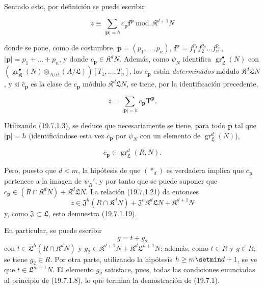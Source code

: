 Sentado esto, por definición se puede escribir
\begin{env}[19.7.1.21]
\label{IV.19.7.1.21}
\[
  z\equiv\sum_{|\mathbf p|=h}c_{\mathbf p}\mathbf f^{\mathbf p}\ \mathrm{mod.}\,\mathfrak K^{d+1}N
\]
\end{env}
donde se pone, como de costumbre, $\mathbf p=(p_1,\ldots,p_n)$, $\mathbf f^{\mathbf p}=f_1^{p_1}f_2^{p_2}\ldots f_n^{p_n}$, $|\mathbf p|=p_1+\ldots+p_n$, y donde $c_{\mathbf p}\in\mathfrak K^dN$. Además, como $\psi_N$ identifica $\operatorname{gr}_{\mathfrak L}^\bullet(N)$ con $(\operatorname{gr}_{\mathfrak K}^\bullet(N)\otimes_{A/\mathfrak K}(A/\mathfrak L))[T_1,\ldots,T_n]$, los $c_{\mathbf p}$ están \emph{determinados} módulo $\mathfrak K^d\mathfrak LN$, y si $\bar c_{\mathbf p}$ es la clase de $c_{\mathbf p}$ módulo $\mathfrak K^d\mathfrak LN$, se tiene, por la identificación precedente,
\begin{env}[19.7.1.22]
\label{IV.19.7.1.22}
\[
  \bar z=\sum_{|\mathbf p|=h}\bar c_{\mathbf p}\mathbf T^{\mathbf p}.
\]
\end{env}
Utilizando (19.7.1.3), se deduce que necesariamente se tiene, para todo $\mathbf p$ tal que $|\mathbf p|=h$ (identificándose esta vez $\bar c_{\mathbf p}$ por $\psi_N$ con un elemento de $\operatorname{gr}_{\mathfrak L}^d(N)$),
\begin{env}[19.7.1.23]
\label{IV.19.7.1.23}
\[
  \bar c_{\mathbf p}\in\operatorname{gr}_{\mathfrak L}^d(R,N).
\]
\end{env}
Pero, puesto que $d<m$, la hipótesis de que $(*_d)$ es verdadera implica que $\bar c_{\mathbf p}$ pertenece a la imagen de $\psi_R'$, y por tanto que se puede suponer que $c_{\mathbf p}\in(R\cap\mathfrak K^dN)+\mathfrak K^d\mathfrak LN$. La relación (19.7.1.21) da entonces
\[
  z\in\mathfrak J^h(R\cap\mathfrak K^dN)+\mathfrak J^h\mathfrak K^d\mathfrak LN+\mathfrak K^{d+1}N
\]
y, como $\mathfrak J\subset\mathfrak L$, esto demuestra (19.7.1.19).


En particular, se puede escribir
\[
  g=t+g_2
\]
con $t\in\mathfrak L^h(R\cap\mathfrak K^dN)$ y $g_2\in\mathfrak K^{d+1}N+\mathfrak K^d\mathfrak L^{h+1}N$; además, como $t\in R$ y $g\in R$, se tiene $g_2\in R$. Por otra parte, utilizando la hipótesis $h\geq m\setmin d+1$, se ve que $t\in\mathfrak L^{m+1}N$. El elemento $g_2$ satisface, pues, todas las condiciones enunciadas al principio de (19.7.1.8), lo que termina la demostración de (19.7.1).

